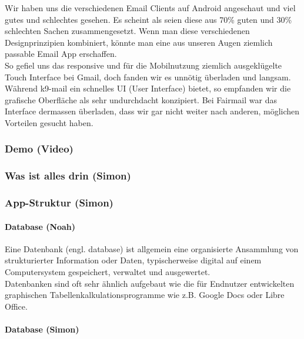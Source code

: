 \documentclass[a4paper,10pt]{scrartcl}
\begin{document}
\begin{multicols}{3}
Wir haben uns die verschiedenen Email Clients auf Android angeschaut und
viel gutes und schlechtes gesehen. Es scheint als seien diese aus 70\%
guten und 30\% schlechten Sachen zusammengesetzt. Wenn man diese
verschiedenen Designprinzipien kombiniert, könnte man eine aus unseren
Augen ziemlich passable Email App erschaffen. \\

So gefiel uns das responsive und für die Mobilnutzung ziemlich
ausgeklügelte Touch Interface bei Gmail, doch fanden wir es unnötig
überladen und langsam.\\

Während k9-mail ein schnelles UI (User Interface)
bietet, so empfanden wir die grafische Oberfläche als sehr undurchdacht
konzipiert. Bei Fairmail war das Interface dermassen überladen, dass wir
gar nicht weiter nach anderen, möglichen Vorteilen gesucht haben.

\subsubsection*{Demo (Video)}

\subsubsection*{Was ist alles drin (Simon)}

\subsubsection*{App-Struktur (Simon)}

\paragraph{Database (Noah)}

Eine Datenbank (engl. database) ist allgemein eine organisierte
Ansammlung von strukturierter Information oder Daten, typischerweise
digital auf einem Computersystem gespeichert, verwaltet und ausgewertet.\\

Datenbanken sind oft sehr ähnlich aufgebaut wie die für Endnutzer
entwickelten graphischen Tabellenkalkulationsprogramme wie z.B. Google
Docs oder Libre Office.

\paragraph{Database (Simon)}


\end{multicols}
\end{document}
